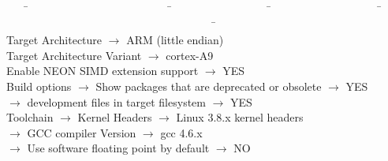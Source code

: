 \documentclass[openany,a4paper]{book}
\begin{document}
\begin{tabbing}
\kill \ \ \ \= \ \ \ \ \ \ \ \ \ \ \ \ \ \ \ \ \ \ \ \ \ \ \ \ \ \ \= \ \ \ \ \ \ \ \ \ \ \ \ \ \ \ \ \ \ \= \ \ \ \ \ \ \ \ \ \ \ \ \ \ \ \ \ \ \ \ \= \ \ \ \ \ \ \ \ \ \ \ \ \ \ \ \ \ \ \ \ \ \ \ \ \ \ \ \ \ \ \ \ \ \ \ \ \ \ \ \ \ \ \= \ \ \ \ \ \ \ \= \\
\> Target Architecture                \>                                                             \>                                                          \> $\rightarrow$ ARM (little endian) \\
\> Target Architecture Variant        \>                                                             \>                                                          \> $\rightarrow$ cortex-A9 \\
\> Enable NEON SIMD extension support \>                                                             \>                                                          \>                                                          \> $\rightarrow$ YES \\
\> Build options                      \> $\rightarrow$ Show packages that are deprecated or obsolete \>                                                          \>                                                          \> $\rightarrow$ YES \\
\>                                    \> $\rightarrow$ development files in target filesystem        \>                                                          \>                                                          \> $\rightarrow$ YES \\
\> Toolchain                          \> $\rightarrow$ Kernel Headers                                \>                                                          \> $\rightarrow$ Linux 3.8.x kernel headers \\
\>                                    \> $\rightarrow$ GCC compiler Version                          \>                                                          \> $\rightarrow$ gcc 4.6.x \\
\>                                    \> $\rightarrow$ Use software floating point by default        \>                                                          \>                                                          \> $\rightarrow$ NO \\

\end{tabbing}
\end{document}
